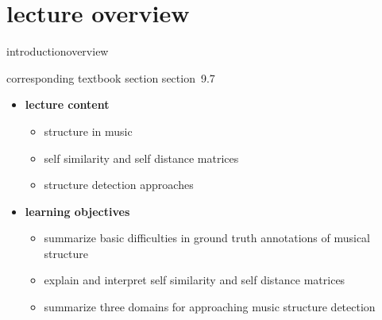 


\subtitle{module 9.7: music structure detection}


	

    \section[overview]{lecture overview}
        \begin{frame}{introduction}{overview}
            \begin{block}{corresponding textbook section}
                    section~9.7
            \end{block}

            \begin{itemize}
                \item   \textbf{lecture content}
                    \begin{itemize}
                        \item   structure in music
                        \item   self similarity and self distance matrices
                        \item   structure detection approaches
                    \end{itemize}
                \bigskip
                \item<2->   \textbf{learning objectives}
                    \begin{itemize}
                        \item   summarize basic difficulties in ground truth annotations of musical structure
                        \item   explain and interpret self similarity and self distance matrices
                        \item   summarize three domains for approaching music structure detection
                    \end{itemize}
            \end{itemize}
        \end{frame}

